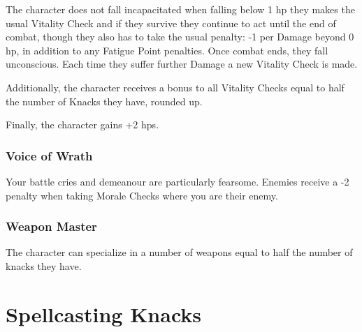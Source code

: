 \begin{multicols}{2}
The character does not fall incapacitated when falling below 1 \gls{hp} they makes the usual Vitality Check and if they survive they continue to act until the end of combat, though they also has to take the usual penalty: -1 per Damage beyond 0 \gls{hp}, in addition to any Fatigue Point penalties.
Once combat ends, they fall unconscious.
Each time they suffer further Damage a new Vitality Check is made.

Additionally, the character receives a bonus to all Vitality Checks equal to half the number of Knacks they have, rounded up.

Finally, the character gains +2 \glspl{hp}.

\subsubsection{Voice of Wrath}

Your battle cries and demeanour are particularly fearsome. Enemies receive a -2 penalty when taking Morale Checks where you are their enemy.

\subsubsection{Weapon Master}

\iftoggle{verbose}{
	The character has trained long and hard with a particular weapon, such as a longsword, spear, shortbow, or rocks.
	
}{
	Gain +1 to the Combat score when using a specialized weapon.
}%
	The character can specialize in a number of weapons equal to half the number of knacks they have.

\end{multicols}

\section{Spellcasting Knacks}

